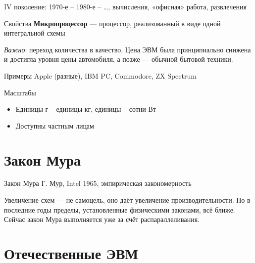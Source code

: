 \documentclass[xetex,aspectratio=43]{beamer}
\begin{document}
\begin{frame}{IV поколение: 1970-е -- 1980-е -- \ldots, вычисления, «офисная» работа, развлечения}

	\begin{block}{Свойства}
		\textbf{Микропроцессор} --- процессор, реализованный в виде одной
		интегральной схемы
		
		\emph{Важно}: переход количества в качество. Цена ЭВМ была принципиально
		снижена и достигла уровня цены автомобиля, а позже --- обычной бытовой
		техники.
	\end{block}
	
	\begin{block}{Примеры}
		Apple (разные), IBM PC, Commodore, ZX Spectrum
	\end{block}
	
	\begin{block}{Масштабы}
		\begin{itemize}
			\item
			Единицы г -- единицы кг, единицы -- сотни Вт
			\item
			Доступны частным лицам
		\end{itemize}
	\end{block}
\end{frame}

\section{Закон Мура}

\begin{frame}{Закон Мура}
	Г. Мур, Intel 1965, эмпирическая закономерность
	
	
	\pause
	
	Увеличение схем --- не самоцель, оно даёт увеличение производительности.
	Но в последние годы пределы, установленные физическими законами, всё
	ближе. Сейчас закон Мура выполняется уже за счёт распараллеливания.
\end{frame}

\section{Отечественные ЭВМ}
\end{document}
